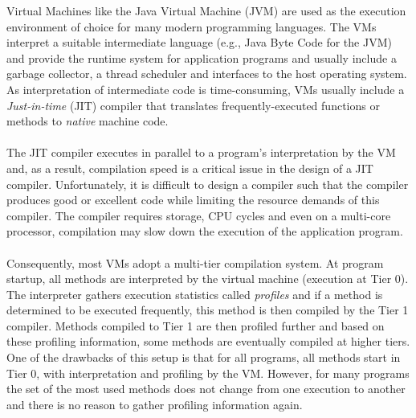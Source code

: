 Virtual Machines like the Java Virtual Machine (JVM) are used as the execution environment of choice for many modern programming languages. 
The VMs interpret a suitable intermediate language (e.g., Java Byte Code for the JVM) and provide the runtime system for application programs and usually include a garbage collector, a thread scheduler and interfaces to the host operating system. 
As interpretation of intermediate code is time-consuming, VMs usually include a \textit{Just-in-time} (JIT) compiler that translates frequently-executed functions or methods to \textit{native} machine code.
\\\\
The JIT compiler executes in parallel to a program's interpretation by the VM and, as a result, compilation speed is a critical issue in the design of a JIT compiler.
Unfortunately, it is difficult to design a compiler such that the compiler produces good or excellent code while limiting the resource demands of this compiler. The compiler requires storage, CPU cycles and even on a multi-core processor, compilation may slow down the execution of the application program.
\\\\
Consequently, most VMs adopt a multi-tier compilation system.
At program startup, all methods are interpreted by the virtual machine (execution at Tier 0). The interpreter gathers execution statistics called \textit{profiles} and if a method is determined to be executed frequently, this method is then compiled by the Tier 1 compiler. Methods compiled to Tier 1 are then profiled further and based on these profiling information, some methods are eventually compiled at higher tiers.
One of the drawbacks of this setup is that for all programs, all methods start in Tier 0, with interpretation and profiling by the VM. However, for many programs the set of the most used methods does not change from one execution to another and there is no reason to gather profiling information again. 
